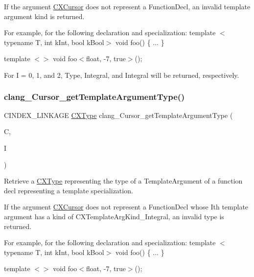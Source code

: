 If the argument \hyperlink{structCXCursor}{C\+X\+Cursor} does not represent a Function\+Decl, an invalid template argument kind is returned.

For example, for the following declaration and specialization\+: template $<$typename T, int k\+Int, bool k\+Bool$>$ void foo() \{ ... \}

template $<$$>$ void foo$<$float, -\/7, true$>$();

For I = 0, 1, and 2, Type, Integral, and Integral will be returned, respectively. \mbox{\label{group__CINDEX__TYPES_gae3fab0d8906e4531a1b7fbe77b4b4bc1}} 
\subsubsection{\texorpdfstring{clang\+\_\+\+Cursor\+\_\+get\+Template\+Argument\+Type()}{clang\_Cursor\_getTemplateArgumentType()}}
{\footnotesize\ttfamily C\+I\+N\+D\+E\+X\+\_\+\+L\+I\+N\+K\+A\+GE \hyperlink{structCXType}{C\+X\+Type} clang\+\_\+\+Cursor\+\_\+get\+Template\+Argument\+Type (\begin{DoxyParamCaption}\item[{\hyperlink{structCXCursor}{C\+X\+Cursor}}]{C,  }\item[{unsigned}]{I }\end{DoxyParamCaption})}



Retrieve a \hyperlink{structCXType}{C\+X\+Type} representing the type of a Template\+Argument of a function decl representing a template specialization. 

If the argument \hyperlink{structCXCursor}{C\+X\+Cursor} does not represent a Function\+Decl whose I\textquotesingle{}th template argument has a kind of C\+X\+Template\+Arg\+Kind\+\_\+\+Integral, an invalid type is returned.

For example, for the following declaration and specialization\+: template $<$typename T, int k\+Int, bool k\+Bool$>$ void foo() \{ ... \}

template $<$$>$ void foo$<$float, -\/7, true$>$();

